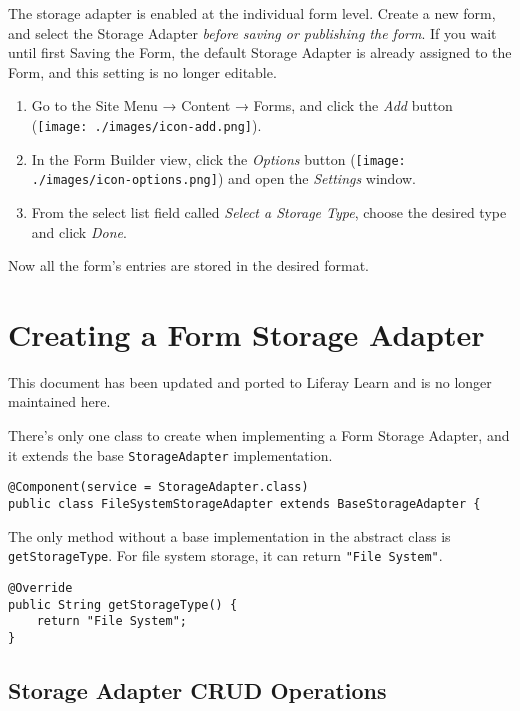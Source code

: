 The storage adapter is enabled at the individual form level. Create a
new form, and select the Storage Adapter \emph{before saving or
publishing the form}. If you wait until first Saving the Form, the
default Storage Adapter is already assigned to the Form, and this
setting is no longer editable.

\begin{enumerate}
\def\labelenumi{\arabic{enumi}.}
\item
  Go to the Site Menu → Content → Forms, and click the \emph{Add} button
  (\texttt{[image: ./images/icon-add.png]}).
\item
  In the Form Builder view, click the \emph{Options} button
  (\texttt{[image: ./images/icon-options.png]}) and open the
  \emph{Settings} window.
\item
  From the select list field called \emph{Select a Storage Type}, choose
  the desired type and click \emph{Done}.
\end{enumerate}

Now all the form's entries are stored in the desired format.

\chapter{Creating a Form Storage
Adapter}\label{creating-a-form-storage-adapter}

{This document has been updated and ported to Liferay Learn and is no
longer maintained here.}

There's only one class to create when implementing a Form Storage
Adapter, and it extends the base \texttt{StorageAdapter} implementation.

\begin{verbatim}
@Component(service = StorageAdapter.class)
public class FileSystemStorageAdapter extends BaseStorageAdapter {
\end{verbatim}

The only method without a base implementation in the abstract class is
\texttt{getStorageType}. For file system storage, it can return
\texttt{"File\ System"}.

\begin{verbatim}
@Override
public String getStorageType() {
    return "File System";
}
\end{verbatim}

\section{Storage Adapter CRUD
Operations}\label{storage-adapter-crud-operations}

